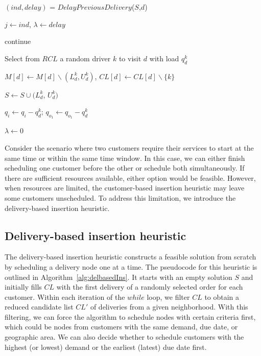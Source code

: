 {\begin{algorithm}[htpb]
{{{{                $(ind,delay)$ = $DelayPreviousDelivery$($S$,$d$)

                $j \leftarrow ind$, $\lambda \leftarrow delay$

                continue 

            }
            Select from $RCL$ a random driver $k$ to visit $d$ with load $q^k_d$

            $M[d]\leftarrow M[d] \backslash (L^k_{d}, U^k_{d})$, $CL[d]\leftarrow CL[d] \backslash \{k\} $

            $S \leftarrow S \cup (L^k_{d}$, $U^k_{d})  $

            $q_i \leftarrow q_i-q^k_{d}$;  $q_{o_1} \leftarrow q_{o_1}-q^k_{d}$

            $\lambda \leftarrow 0$

            }
            }
            }

        \end{algorithm}
    }

Consider the scenario where two customers require their services to start at the same time or within the same time window. In this case, we can either finish scheduling one customer before the other or schedule both simultaneously.  If there are sufficient resources available, either option would be feasible. However, when resources are limited, the customer-based insertion heuristic may leave some customers unscheduled. To address this limitation, we introduce the delivery-based insertion heuristic.

\subsection{Delivery-based insertion heuristic}

The delivery-based insertion heuristic constructs a feasible solution from scratch by scheduling a delivery node one at a time. The pseudocode for this heuristic is outlined in Algorithm~\ref{alg:delbasedIns}. It starts with an empty solution $S$ and initially fills $CL$ with the first delivery of a randomly selected order for each customer. Within each iteration of the $while$ loop, we filter $CL$ to obtain a reduced candidate list $CL'$ of deliveries from a given neighborhood. With this filtering, we can force the algorithm to schedule nodes with certain criteria first, which could be nodes from customers with the same demand, due date, or geographic area. We can also decide whether to schedule customers with the highest (or lowest) demand or the earliest (latest) due date first.

